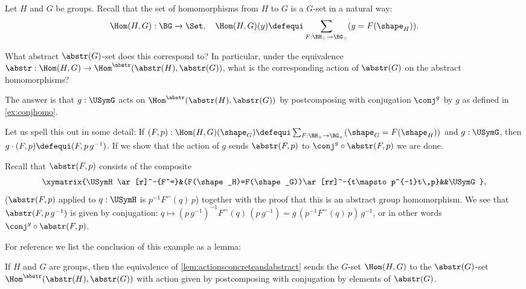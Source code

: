 \begin{example}
  \label{ex:abstrandconj}
  Let $H$ and $G$ be groups.  Recall that the set of homomorphisms from $H$ to $G$ is a $G$-set in a natural way:
$$\Hom(H,G):\BG\to\Set,\quad \Hom(H,G)(y)\defequi \sum_{F:\BH_\div\to \BG_\div}(y=F(\shape_H)).$$

What abstract $\abstr(G)$-set does this correspond to?
In particular, under the equivalence $\abstr:\Hom(H,G)\to\Hom^\abstr(\abstr(H),\abstr(G))$, what is the corresponding action of $\abstr(G)$ on the abstract homomorphisms?

The answer is that $g:\USymG$ acts on $\Hom^\abstr(\abstr(H),\abstr(G))$ by postcomposing with conjugation $\conj^g$ by $g$ as defined in \cref{ex:conjhomo}.

Let us spell this out in some detail:
If $(F,p):\Hom(H,G)(\shape_G)\defequi
 \sum_{F:\BH_\div\to \BG_\div}(\shape_G=F(\shape_H))$ and $g:\USymG$, then $g\cdot(F,p)\defequi(F,p\,g^{-1})$.  If we show that the action of $g$ sends $\abstr(F,p)$ to $\conj^g\circ\abstr(F,p)$ we are done.

Recall that $\abstr(F,p)$ consists of the composite
$$\xymatrix{\USymH\ar[r]^-{F^=}&(F(\shape_H)=F(\shape_G))\ar[rr]^-{t\mapsto p^{-1}t\,p}&&\USymG},$$
(\ie $\abstr(F,p)$ applied to $q:\USymH $ is  $p^{-1}F^=(q)\,p$)  together with the proof that this is an abstract group homomorphism.
We see that $\abstr(F,p\,g^{-1})$ is given by conjugation:
$q\mapsto(p\,g^{-1})^{-1}F^=(q)\,(p\,g^{-1})=g\,(p^{-1}F^=(q)\,p)\,g^{-1}$, or in other words $\conj^g\circ\abstr(F,p)$.
\end{example}
For reference we list the conclusion of this example as a lemma:
\begin{lemma}\label{lem:abstrandconj}
  If $H$ and $G$ are groups, then the equivalence of \cref{lem:actionsconcreteandabstract} sends the $G$-set $\Hom(H,G)$ to the $\abstr(G)$-set $\Hom^\abstr(\abstr(H),\abstr(G))$ with action given by postcomposing with conjugation by elements of $\abstr(G)$.
\end{lemma}

